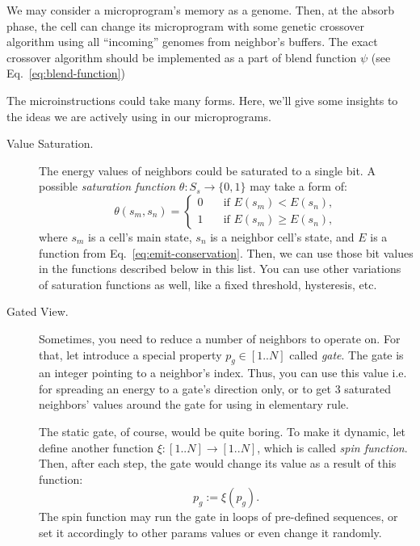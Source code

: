 \documentclass[a4paper,12pt,tikz,UTF8]{article}
\begin{document}
    We may consider a microprogram's memory as a genome. Then, at the absorb phase, the cell can change its microprogram with some genetic crossover algorithm using all ``incoming'' genomes from neighbor's buffers. The exact crossover algorithm should be implemented as a part of blend function $\psi$ (see Eq.~\ref{eq:blend-function})

    The microinstructions could take many forms. Here, we'll give some insights to the ideas we are actively using in our microprograms.
    \begin{description}
      \item [Value Saturation.] The energy values of neighbors could be saturated to a single bit. A possible \textit{saturation function} $\theta: S_s \to \{ 0, 1 \}$ may take a form of:
        \begin{equation}
          \theta(s_m, s_n) = 
          \begin{cases}
            0 \quad & \text{if } E(s_m) < E(s_n),\\
            1 \quad & \text{if } E(s_m) \geq E(s_n),
          \end{cases}
        \end{equation}
        where $s_m$ is a cell's main state, $s_n$ is a neighbor cell's state, and $E$ is a function from Eq.~\ref{eq:emit-conservation}. Then, we can use those bit values in the functions described below in this list. You can use other variations of saturation functions as well, like a fixed threshold, hysteresis, etc.
      \item [Gated View.] Sometimes, you need to reduce a number of neighbors to operate on. For that, let introduce a special property $p_g \in {[1 .. N]}$ called \textit{gate}. The gate is an integer pointing to a neighbor's index. Thus, you can use this value i.e. for spreading an energy to a gate's direction only, or to get 3 saturated neighbors' values around the gate for using in elementary rule.
        
        The static gate, of course, would be quite boring. To make it dynamic, let define another function $\xi: {[1 .. N]} \to {[1 .. N]}$, which is called \textit{spin function}. Then, after each step, the gate would change its value as a result of this function:
        \begin{equation}
          p_g := \xi(p_g).
        \end{equation}
        The spin function may run the gate in loops of pre-defined sequences, or set it accordingly to other params values or even change it randomly.


\end{description}
\end{document}
